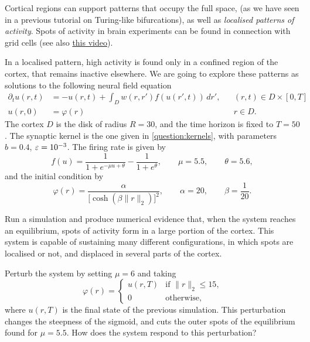 \documentclass[a4paper]{siamonline220329}
\theoremstyle{plain}
\renewcommand\phi\varphi
\begin{document}
\begin{question}\label{question:spots}
  Cortical regions can support patterns that occupy the full space, 
  (as we have seen in a previous tutorial on Turing-like bifurcations), as well as
  \textit{localised patterns of activity}. Spots of activity in brain experiments can
  be found in connection with grid cells \cite{haftingMicrostructureSpatialMap2005} (see
  also \href{https://www.youtube.com/watch?v=i9GiLBXWAHI}{this video}).

  In a localised pattern, high activity is found only in a confined region of the
  cortex, that remains inactive elsewhere. We are going to explore these patterns as
  solutions to the following neural field equation
\begin{equation}
  \begin{aligned}
    \partial_{t} u(r,t) & = -u(r,t) + \int_{D} w(r,r') f(u(r',t))\,d r',
      && (r,t) \in D \times [0,T] \\
    u(r,0) & = \varphi(r)
      && r \in D.
  \end{aligned}
\end{equation}
  The cortex $D$ is the disk of radius $R=30$, and the time horizon is fixed to
  $T=50$. The synaptic kernel is the one given in \cref{question:kernels}, with
  parameters $b =0.4$, $\varepsilon = 10^{-3}$. The firing rate is given by
  \[
    f(u) = \frac{1}{1+e^{-\mu u+\theta}} - \frac{1}{1+e^{\theta}},
    \qquad \mu =5.5, \qquad \theta = 5.6,
  \]
  and the initial condition by 
  \[
    \varphi(r) = \frac{\alpha}{\bigl[\cosh(\beta \| r \|_2)\bigr]^2},
   \qquad \alpha = 20, \qquad \beta = \frac{1}{20}. 
  \]

  Run a simulation and produce numerical evidence that, when the system reaches an
  equilibrium, spots of activity form in a large portion of the cortex. This system
  is capable of sustaining many different configurations, in which spots are
  localised or not, and displaced in several parts  of the cortex.

  Perturb the system by setting $\mu =6$ and taking
  \[
    \phi(r) = 
    \begin{cases}
      u(r,T) & \text{if $\| r \|_2  \leq 15$,} \\
      0      & \text{otherwise,} 
    \end{cases}
  \]
  where $u(r,T)$ is the final state of the previous simulation. This perturbation
  changes the steepness of the sigmoid, and cuts the outer spots of the
  equilibrium found for $\mu = 5.5$. How does the system respond to this perturbation?
\end{question}
\end{document}
